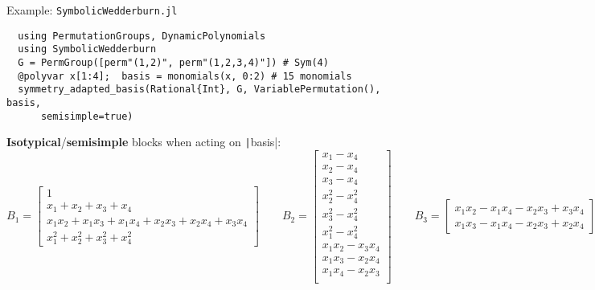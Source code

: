 \begin{frame}[fragile]{Example: {\texttt{SymbolicWedderburn.jl}}}
\scriptsize
\begin{verbatim}
  using PermutationGroups, DynamicPolynomials
  using SymbolicWedderburn
  G = PermGroup([perm"(1,2)", perm"(1,2,3,4)"]) # Sym(4)
  @polyvar x[1:4];  basis = monomials(x, 0:2) # 15 monomials
  symmetry_adapted_basis(Rational{Int}, G, VariablePermutation(), basis, 
      semisimple=true)
\end{verbatim}
\normalsize
\textbf{Isotypical}/\textbf{semisimple} blocks when acting on \texttt|basis|:
\tiny
\[
  B_1 = \begin{bmatrix}
          1\\
          x_1 + x_2 + x_3 + x_4\\
          x_{1}x_{2} + x_{1}x_{3} + x_{1}x_{4} + x_{2}x_{3} + x_{2}x_{4} + x_{3}x_{4}\\
          x_{1}^{2} + x_{2}^{2} + x_{3}^{2} + x_{4}^{2}
        \end{bmatrix}
  \qquad
  B_2 = \begin{bmatrix}
        x_{1} - x_{4}\\
        x_{2} - x_{4}\\
        x_{3} - x_{4}\\
        x_{2}^{2} - x_{4}^{2}\\
        x_{3}^{2} - x_{4}^{2}\\
        x_{1}^{2} - x_{4}^{2}\\
        x_{1}x_{2} - x_{3}x_{4}\\
        x_{1}x_{3} - x_{2}x_{4}\\
        x_{1}x_{4} - x_{2}x_{3}\\
        \end{bmatrix}
  \qquad
  B_3 = \begin{bmatrix}
        x_{1}x_{2} - x_{1}x_{4} - x_{2}x_{3} + x_{3}x_{4}\\
        x_{1}x_{3} - x_{1}x_{4} - x_{2}x_{3} + x_{2}x_{4}
        \end{bmatrix}
\]

\end{frame}

